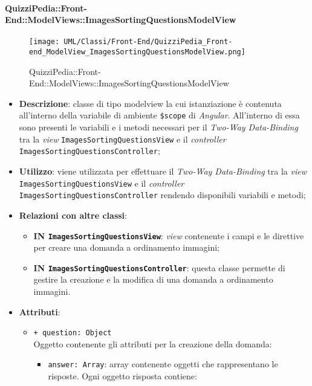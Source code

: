 \paragraph{QuizziPedia::Front-End::ModelViews::ImagesSortingQuestionsModelView}
\begin{figure} [ht]
	\centering
	\texttt{[image: UML/Classi/Front-End/QuizziPedia\_Front-end\_ModelView\_ImagesSortingQuestionsModelView.png]}
	\caption{QuizziPedia::Front-End::ModelViews::ImagesSortingQuestionsModelView}
\end{figure} \FloatBarrier
\begin{itemize}
	\item \textbf{Descrizione}: classe di tipo modelview la cui istanziazione è contenuta all'interno della variabile di ambiente \texttt{\$scope} di \textit{Angular}. All'interno di essa sono presenti le variabili e i metodi necessari per il \textit{Two-Way Data-Binding} tra la \textit{view} \texttt{ImagesSortingQuestionsView} e il \textit{controller} \texttt{ImagesSortingQuestionsController}; 
	\item \textbf{Utilizzo}: viene utilizzata per effettuare il \textit{Two-Way Data-Binding} tra la \textit{view}\\ \texttt{ImagesSortingQuestionsView} e il \textit{controller} \texttt{ImagesSortingQuestionsController} rendendo disponibili variabili e metodi;
	\item \textbf{Relazioni con altre classi}:
	\begin{itemize}
		\item \textbf{IN \texttt{ImagesSortingQuestionsView}}: \textit{view} contenente i campi e le direttive per creare una domanda a ordinamento immagini; 
		\item \textbf{IN \texttt{ImagesSortingQuestionsController}}: questa classe permette di gestire la creazione e la modifica di una domanda a ordinamento immagini.
	\end{itemize}
	\item \textbf{Attributi}:
	\begin{itemize}
		\item \texttt{+ question: Object} \\ Oggetto contenente gli attributi per la creazione della domanda:
		\begin{itemize}
			\item \texttt{answer: Array}: array contenente oggetti che rappresentano le risposte. Ogni oggetto risposta contiene:
			\begin{enumerate}

\end{enumerate}
\end{itemize}
\end{itemize}
\end{itemize}
